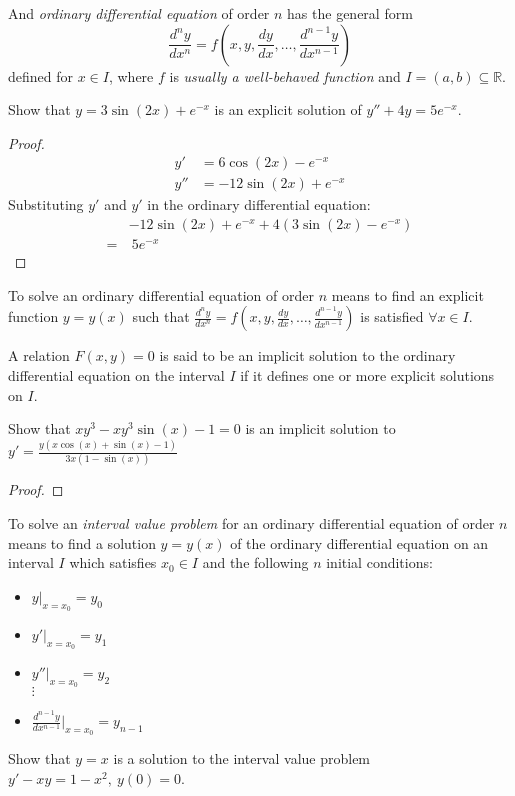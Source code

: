


\begin{definition}
  And \emph{ordinary differential equation} of order $n$ has the general form
  \[\frac{d^ny}{dx^n} = f\left(x,y,\frac{dy}{dx},\ldots, \frac{d^{n-1}y}{dx^{n-1}}\right)\]
  defined for $x \in I$, where $f$ is \textit{usually a well-behaved function} and $I = (a,b) 
  \subseteq \mathbb R$.
\end{definition}

\begin{example}
Show that $y = 3\sin(2x) + e^{-x}$ is an explicit solution of $y'' + 4y = 5e^{-x}$.
\begin{proof}
\begin{align*}
  y' &= 6\cos(2x) - e^{-x} \\
  y'' &= -12\sin(2x) + e^{-x}
\end{align*}
Substituting $y'$ and $y'$ in the ordinary differential equation:
\begin{align*}
  & -12\sin(2x) + e^{-x} + 4\left( 3\sin(2x) - e^{-x} \right)\\
=&\ 5e^{-x} 
\end{align*}
\end{proof}
\end{example}

To solve an ordinary differential equation of order $n$ means to find an explicit function
$y=y(x)$ such that $\frac{d^ny}{dx^n} = f\left(x,y,\frac{dy}{dx}, \ldots, \frac{d^{n-1}y}{dx^{n-1}}\right)$ is
satisfied $\forall x \in I$.


A relation $F(x,y) = 0$ is said to be an implicit solution to the ordinary
differential equation on the interval $I$ if it defines one or more explicit
solutions on $I$.

\begin{example}
  Show that $xy^{3}-xy^{3}\sin(x)-1=0$ is an implicit solution to $y' =
  \frac{y\left(x\cos(x) + \sin(x) - 1\right)}{3x(1-\sin(x))}$
  \begin{proof}
  \end{proof}
\end{example}

To solve an \emph{interval value problem} for an ordinary differential equation of
order $n$ means to find a solution $y=y(x)$ of the ordinary differential equation on
an interval $I$ which satisfies $x_0 \in I$ and the following $n$ initial conditions:

\begin{itemize}
  \item $y\big|_{x=x_0} = y_0$
  \item $y'\big|_{x=x_0} = y_1$
  \item $y''\big|_{x=x_0} = y_2$
  \\ $\vdots$
  \item $\frac{d^{n-1}y}{dx^{n-1}}\big|_{x=x_0} = y_{n-1}$
\end{itemize}

\begin{example}
  Show that $y=x$ is a solution to the interval value problem $y' -xy = 1-x^{2},\ 
  y(0) = 0$.
\end{example}
